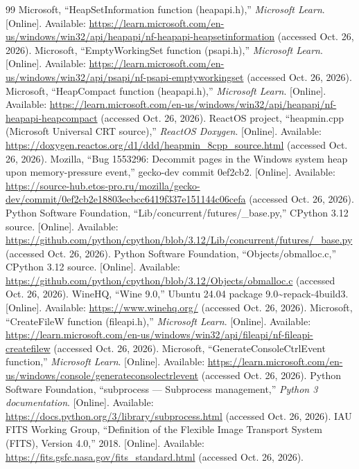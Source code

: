 \documentclass[11pt,a4paper]{article}
\newcommand{\code}[1]{\texttt{\detokenize{#1}}}
\begin{document}
\begin{thebibliography}{99}
 Microsoft, ``HeapSetInformation function (heapapi.h),'' \emph{Microsoft Learn}. [Online]. Available: \url{https://learn.microsoft.com/en-us/windows/win32/api/heapapi/nf-heapapi-heapsetinformation} (accessed Oct. 26, 2026).
 Microsoft, ``EmptyWorkingSet function (psapi.h),'' \emph{Microsoft Learn}. [Online]. Available: \url{https://learn.microsoft.com/en-us/windows/win32/api/psapi/nf-psapi-emptyworkingset} (accessed Oct. 26, 2026).
 Microsoft, ``HeapCompact function (heapapi.h),'' \emph{Microsoft Learn}. [Online]. Available: \url{https://learn.microsoft.com/en-us/windows/win32/api/heapapi/nf-heapapi-heapcompact} (accessed Oct. 26, 2026).
 ReactOS project, ``heapmin.cpp (Microsoft Universal CRT source),'' \emph{ReactOS Doxygen}. [Online]. Available: \url{https://doxygen.reactos.org/d1/ddd/heapmin_8cpp_source.html} (accessed Oct. 26, 2026).
 Mozilla, ``Bug 1553296: Decommit pages in the Windows system heap upon memory-pressure event,'' gecko-dev commit 0ef2cb2. [Online]. Available: \url{https://source-hub.etos-pro.ru/mozilla/gecko-dev/commit/0ef2cb2e18803ecbcc6419f337e151144c06cefa} (accessed Oct. 26, 2026).
 Python Software Foundation, ``Lib/concurrent/futures/\_base.py,'' CPython 3.12 source. [Online]. Available: \url{https://github.com/python/cpython/blob/3.12/Lib/concurrent/futures/_base.py} (accessed Oct. 26, 2026).
 Python Software Foundation, ``Objects/obmalloc.c,'' CPython 3.12 source. [Online]. Available: \url{https://github.com/python/cpython/blob/3.12/Objects/obmalloc.c} (accessed Oct. 26, 2026).
 WineHQ, ``Wine 9.0,'' Ubuntu 24.04 package \code{wine64} 9.0\textasciitilde repack-4build3. [Online]. Available: \url{https://www.winehq.org/} (accessed Oct. 26, 2026).
 Microsoft, ``CreateFileW function (fileapi.h),'' \emph{Microsoft Learn}. [Online]. Available: \url{https://learn.microsoft.com/en-us/windows/win32/api/fileapi/nf-fileapi-createfilew} (accessed Oct. 26, 2026).
 Microsoft, ``GenerateConsoleCtrlEvent function,'' \emph{Microsoft Learn}. [Online]. Available: \url{https://learn.microsoft.com/en-us/windows/console/generateconsolectrlevent} (accessed Oct. 26, 2026).
 Python Software Foundation, ``subprocess --- Subprocess management,'' \emph{Python 3 documentation}. [Online]. Available: \url{https://docs.python.org/3/library/subprocess.html} (accessed Oct. 26, 2026).
 IAU FITS Working Group, ``Definition of the Flexible Image Transport System (FITS), Version 4.0,'' 2018. [Online]. Available: \url{https://fits.gsfc.nasa.gov/fits_standard.html} (accessed Oct. 26, 2026).
\end{thebibliography}
\endgroup
\end{document}
